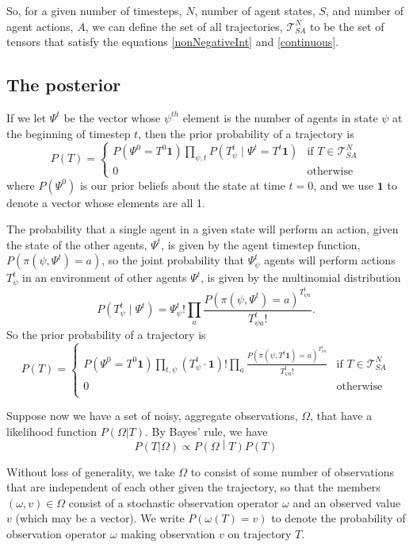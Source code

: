 \documentclass{article}
\begin{document}
So, for a given number of timesteps, $N$, number of agent states, $S$, and number of agent actions, $A$, we can define the set of all trajectories, $\mathcal{T}^N_{SA}$ to be the set of tensors that satisfy the equations \ref{nonNegativeInt} and \ref{continuous}.

\subsection{The posterior}

If we let $\Psi^t$ be the vector whose $\psi^{th}$ element is the number of agents in state $\psi$ at the beginning of timestep $t$, then the prior probability of a trajectory is
\[
P(T) =
\begin{cases}
P\left(\Psi^0 = T^0 \mathbf{1} \right) \prod_{\psi, t} P\left(T^t_{\psi} \mid \Psi^t = T^t \mathbf{1}\right) & \text{if } T \in \mathcal{T}^N_{SA} \\
0 & \text{otherwise}
\end{cases}
\]
where $P(\Psi^0)$ is our prior beliefs about the state at time $t=0$, and we use $\mathbf{1}$ to denote a vector whose elements are all 1.


The probability that a single agent in a given state will perform an action, given the state of the other agents, $\Psi^t$, is given by the agent timestep function, $P(\pi(\psi,\Psi^t)=a)$, so the joint probability that $\Psi^t_\psi$ agents will perform actions $T^t_{\psi}$ in an environment of other agents $\Psi^t$, is given by the multinomial distribution
\[
P\left(T^t_{\psi} \mid \Psi^t \right) = \Psi^t_\psi!\prod_a \frac{P\left(\pi(\psi,\Psi^t)=a\right)^{T^{t}_{\psi a}}}{T^{t}_{\psi a}!}.
\]
So the prior probability of a trajectory is
\[
P(T) =
\begin{cases}
P(\Psi^0 = T^0\mathbf{1})
\prod_{t, \psi}\left(T^t_{\psi} \cdot \mathbf{1} \right)!
\prod_a \frac{P(\pi(\psi, T^{t}\mathbf{1})=a)^{T^{t}_{\psi a}}}{T^{t}_{\psi a}!} & \text{if } T \in \mathcal{T}^N_{SA} \\
0 & \text{otherwise}\\
\end{cases}
\]

Suppose now we have a set of noisy, aggregate observations, $\Omega$, that have a likelihood function $P(\Omega|T)$. By Bayes' rule, we have
\[
P(T|\Omega) \propto P\left(\Omega \middle| T\right)P(T)
\]

Without loss of generality, we take $\Omega$ to consist of some number of observations that are independent of each other given the trajectory, so that the members $(\omega,v)\in \Omega$ consist of a stochastic observation operator $\omega$ and an observed value $v$ (which may be a vector). We write $P(\omega(T)=v)$ to denote the probability of observation operator $\omega$ making observation $v$ on trajectory $T$.
\end{document}

